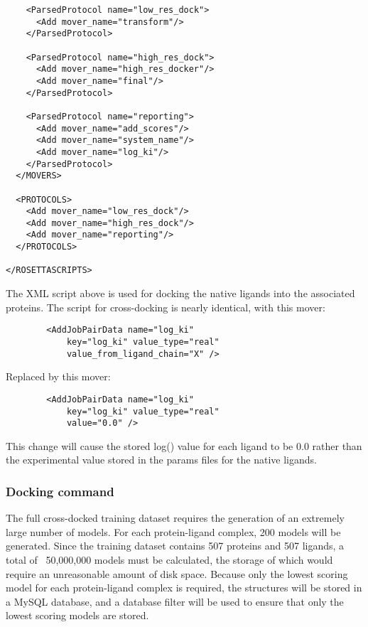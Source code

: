 \begin{verbatim}
    <ParsedProtocol name="low_res_dock">
      <Add mover_name="transform"/>
    </ParsedProtocol>
    
    <ParsedProtocol name="high_res_dock">
      <Add mover_name="high_res_docker"/>
      <Add mover_name="final"/>
    </ParsedProtocol>

    <ParsedProtocol name="reporting">
      <Add mover_name="add_scores"/>
      <Add mover_name="system_name"/>
      <Add mover_name="log_ki"/>
    </ParsedProtocol>
  </MOVERS>
  
  <PROTOCOLS>
    <Add mover_name="low_res_dock"/>
    <Add mover_name="high_res_dock"/>
    <Add mover_name="reporting"/>
  </PROTOCOLS>
  
</ROSETTASCRIPTS>
\end{verbatim}
\doublespace
The XML script above is used for docking the native ligands into the associated proteins.
The script for cross-docking is nearly identical, with this mover:
\singlespace
\begin{verbatim}
        <AddJobPairData name="log_ki"
            key="log_ki" value_type="real"
            value_from_ligand_chain="X" />
\end{verbatim}
\doublespace
Replaced by this mover:
\singlespace
\begin{verbatim}
        <AddJobPairData name="log_ki"
            key="log_ki" value_type="real"
            value="0.0" />
\end{verbatim}
\doublespace
This change will cause the stored log(\ki) value for each ligand to be 0.0 rather than the experimental value stored in the params files for the native ligands.

\subsubsection{Docking command}
\label{subsubsec:hts_docking_command}
The full cross-docked training dataset requires the generation of an extremely large number of models.
For each protein-ligand complex, 200 models will be generated.
Since the training dataset contains 507 proteins and 507 ligands, a total of ~50,000,000 models must be calculated, the storage of which would require an unreasonable amount of disk space.
Because only the lowest scoring model for each protein-ligand complex is required, the structures will be stored in a MySQL database, and a database filter will be used to ensure that only the lowest scoring models are stored.

